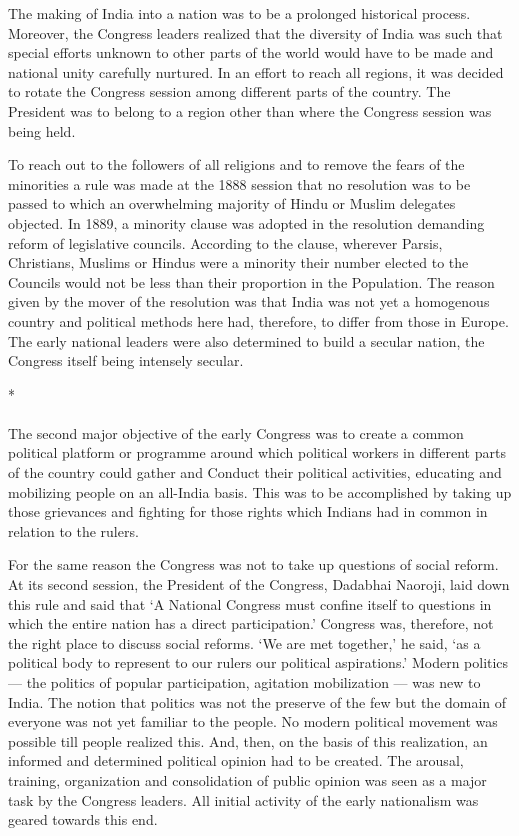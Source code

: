 The making of India into a nation was to be a prolonged historical process. Moreover, the Congress leaders realized that the diversity of India was such that special efforts unknown to other parts of the world would have to be made and national unity carefully nurtured. In an effort to reach all regions, it was decided to rotate the Congress session among different parts of the country. The President was to belong to a region other than where the Congress session was being held.

To reach out to the followers of all religions and to remove the fears of the minorities a rule was made at the 1888 session that no resolution was to be passed to which an overwhelming majority of Hindu or Muslim delegates objected. In 1889, a minority clause was adopted in the resolution demanding reform of legislative councils. According to the clause, wherever Parsis, Christians, Muslims or Hindus were a minority their number elected to the Councils would not be less than their proportion in the Population. The reason given by the mover of the resolution was that India was not yet a homogenous country and political methods here had, therefore, to differ from those in Europe. The early national leaders were also determined to build a secular nation, the Congress itself being intensely secular.

\begin{center}*\end{center}

\paragraph*{}


The second major objective of the early Congress was to create a common political platform or programme around which political workers in different parts of the country could gather and Conduct their political activities, educating and mobilizing people on an all-India basis. This was to be accomplished by taking up those grievances and fighting for those rights which Indians had in common in relation to the rulers.

For the same reason the Congress was not to take up questions of social reform. At its second session, the President of the Congress, Dadabhai Naoroji, laid down this rule and said that `A National Congress must confine itself to questions in which the entire nation has a direct participation.' Congress was, therefore, not the right place to discuss social reforms. `We are met together,' he said, `as a political body to represent to our rulers our political aspirations.' Modern politics — the politics of popular participation, agitation mobilization — was new to India. The notion that politics was not the preserve of the few but the domain of everyone was not yet familiar to the people. No modern political movement was possible till people realized this. And, then, on the basis of this realization, an informed and determined political opinion had to be created. The arousal, training, organization and consolidation of public opinion was seen as a major task by the Congress leaders. All initial activity of the early nationalism was geared towards this end.


